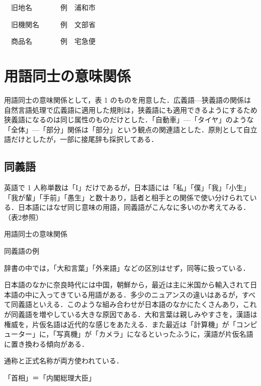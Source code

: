 \documentclass[japanese]{jnlp_1.4}
\begin{document}
　旧地名　　　　例　浦和市

　旧機関名　　　例　文部省

　商品名　　　　例　宅急便



\section{用語同士の意味関係}\label{sec:ITEM}

用語同士の意味関係として，表 1 のものを用意した．広義語—狭義語の関係は自然言語処理で広義語に適用した規則は，狭義語にも適用できるようにするため狭義語になるのは同じ属性のものだけとした．「自動車」—「タイヤ」のような「全体」—「部分」関係は「部分」という観点の関連語とした．原則として自立語だけとしたが，一部に接尾辞も採択してある．


\subsection{同義語}

英語で 1 人称単数は「I」だけであるが，日本語には「私」「僕」「我」「小生」「我が輩」「手前」「愚生」と数十あり，話者と相手との関係で使い分けられている．日本語にはなぜ同じ意味の用語，同義語がこんなに多いのか考えてみる．（表2参照）

\begin{table}[b]
 \caption{用語同士の意味関係}

\end{table}
\begin{table}[b]
 \caption{同義語の例}

\end{table}

辞書の中では，「大和言葉」「外来語」などの区別はせず，同等に扱っている．


日本語のなかに奈良時代には中国，朝鮮から，最近は主に米国から輸入されて日本語の中に入ってきている用語がある．多少のニュアンスの違いはあるが，すべて同義語といえる．このような組み合わせが日本語のなかにたくさんあり，これが同義語を増やしている大きな原因である．大和言葉は親しみやすさを，漢語は権威を，片仮名語は近代的な感じをあたえる．また最近は「計算機」が「コンピューター」に，「写真機」が「カメラ」になるといったふうに，漢語が片仮名語に置き換わる傾向がある．


通称と正式名称が両方使われている．

「首相」＝「内閣総理大臣」
\end{document}
